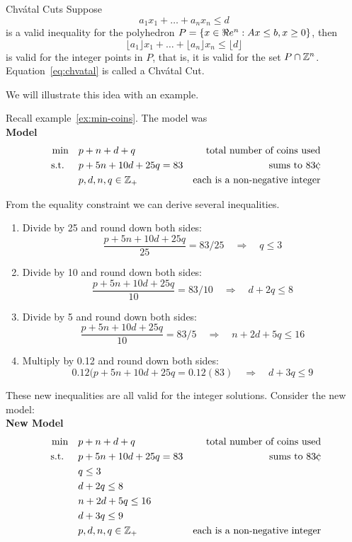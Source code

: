 \begin{general}{Chv\'atal Cuts}{}
Suppose 
\begin{equation}
a_1 x_1 + \dots + a_n x_n \leq d
\end{equation}
is a valid inequality for the polyhedron $P = \{ x \in \Re e^n : Ax \leq b, x \geq 0\}$, then 
\begin{equation}
\label{eq:chvatal}
\lfloor a_1\rfloor x_1 + \dots + \lfloor a_n\rfloor  x_n \leq \lfloor d\rfloor
\end{equation}
is valid for the integer points in $P$, that is, it is valid for the set $P \cap {\mathbb{Z}}^n$.  Equation~\eqref{eq:chvatal} is called a Chv\'atal Cut.
\end{general}


We will illustrate this idea with an example.


\begin{example}{}{}
Recall example~\ref{ex:min-coins}.  The model was\\
\textbf{Model}
\begin{align*}
\min \quad & p + n + d + q & \text{ total number of coins used}\\
\text{ s.t. } \quad & p + 5n + 10d + 25 q = 83 & \text{sums to } 83 \cent\\
& p,d,n,q \in \Z_+ & \text{each is a non-negative integer}
\end{align*}

From the equality constraint we can derive several inequalities.
\begin{enumerate}
\item Divide by 25 and round down both sides:
\[
\frac{p + 5n + 10d + 25 q}{25} = 83/25 \quad \Rightarrow \quad q \leq 3 
\]
\item Divide by 10 and round down both sides:
\[
\frac{p + 5n + 10d + 25 q}{10} = 83/10 \quad \Rightarrow \quad d + 2q \leq 8 
\]
\item Divide by 5 and round down both sides:
\[
\frac{p + 5n + 10d + 25 q}{10} = 83/5 \quad \Rightarrow \quad n + 2d  + 5q \leq 16
\]
\item Multiply by 0.12 and round down both sides:
\[
0.12(p + 5n + 10d + 25 q = 0.12 (83) \quad \Rightarrow \quad d  + 3q \leq 9
\]
\end{enumerate}
These new inequalities are all valid for the integer solutions.  Consider the new model:\\

\textbf{New Model}
\begin{align*}
\min \quad & p + n + d + q & \text{ total number of coins used}\\
\text{ s.t. } \quad & p + 5n + 10d + 25 q = 83 & \text{sums to } 83 \cent\\
& q \leq 3\\
& d + 2q \leq 8 \\
& n + 2d  + 5q \leq 16\\
& d  + 3q \leq 9\\
& p,d,n,q \in \Z_+ & \text{each is a non-negative integer}
\end{align*}


\end{example}

